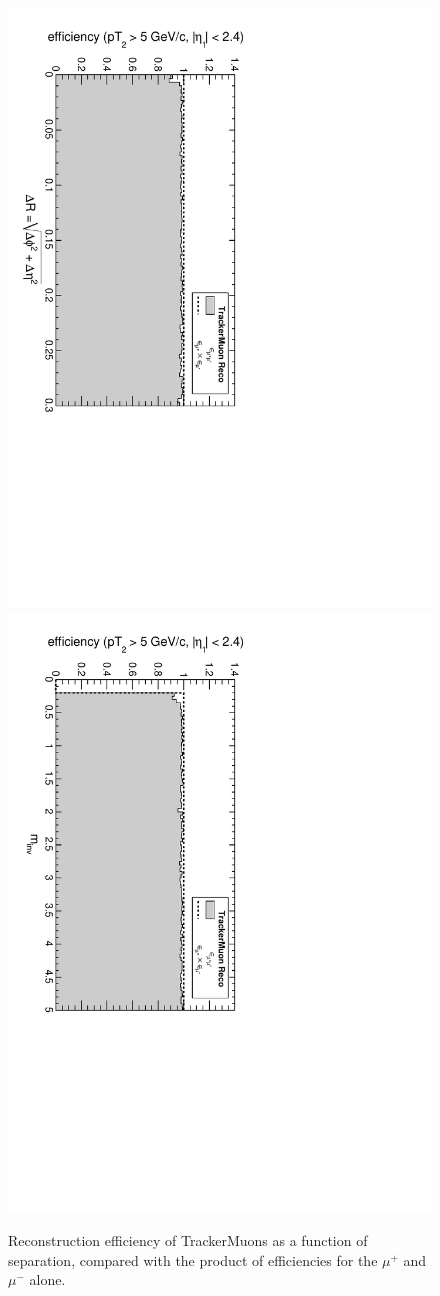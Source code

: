 \documentclass[12pt]{article}
\begin{document}
\begin{figure}[p]
\includegraphics[height=0.5\linewidth, angle=90]{fig/acceptance6_plot/vsdR_TrackerMuons.pdf}
\includegraphics[height=0.5\linewidth, angle=90]{fig/acceptance6_plot/vsmass_TrackerMuons.pdf}

\caption{Reconstruction efficiency of TrackerMuons as a function of
  separation, compared with the product of efficiencies for the
  $\mu^+$ and $\mu^-$ alone. \label{fig:vseverything_TrackerMuons}}
\end{figure}
\end{document}
